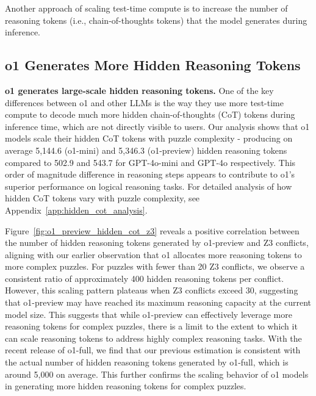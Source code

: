 Another approach of scaling test-time compute is to increase the number of reasoning tokens (i.e., chain-of-thoughts tokens) that the model generates during inference.


\subsection{o1 Generates More Hidden Reasoning Tokens}


\textbf{o1 generates large-scale hidden reasoning tokens.} 
One of the key differences between o1 and other LLMs is the way they use more test-time compute to decode much more hidden chain-of-thoughts (CoT) tokens during inference time, which are not directly visible to users.
Our analysis shows that o1 models scale their hidden CoT tokens with puzzle complexity - producing on average 5,144.6 (o1-mini) and 5,346.3 (o1-preview) hidden reasoning tokens compared to 502.9 and 543.7 for GPT-4o-mini and GPT-4o respectively. This order of magnitude difference in reasoning steps appears to contribute to o1's superior performance on logical reasoning tasks. For detailed analysis of how hidden CoT tokens vary with puzzle complexity, see Appendix~\ref{app:hidden_cot_analysis}.




Figure~\ref{fig:o1_preview_hidden_cot_z3} reveals a positive correlation between the number of hidden reasoning tokens generated by o1-preview and Z3 conflicts, aligning with our earlier observation that o1 allocates more reasoning tokens to more complex puzzles. For puzzles with fewer than 20 Z3 conflicts, we observe a consistent ratio of approximately 400 hidden reasoning tokens per conflict. However, this scaling pattern plateaus when Z3 conflicts exceed 30, suggesting that o1-preview may have reached its maximum reasoning capacity at the current model size. This suggests that while o1-preview can effectively leverage more reasoning tokens for complex puzzles, there is a limit to the extent to which it can scale reasoning tokens to address highly complex reasoning tasks.
With the recent release of o1-full, we find that our previous estimation is consistent with the actual number of hidden reasoning tokens generated by o1-full, which is around 5,000 on average. This further confirms the scaling behavior of o1 models in generating more hidden reasoning tokens for complex puzzles. 

